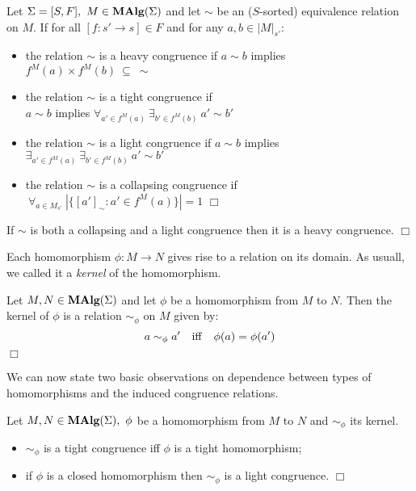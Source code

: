 \begin{Definition}
Let $\Sigma = [S,F],\ M \in \mbox{\rm\bf MAlg}(\Sigma)$ and let $\sim$ be an
($S$-sorted) equivalence relation on $M$.  If for all $[f : s'
\rightarrow s] \in F$ and for any $a,b \in |M|_{s'}$:
\begin{itemize}
\item{the relation $\sim$ is a heavy congruence if
      $a \sim b$ implies $f^M(a) \times f^M(b) \ \subseteq \ \sim$ }
\item{the relation $\sim$ is a tight congruence if \\
      $a \sim b$ implies
      $\forall_{a' \in f^M(a)}\ \exists_{b' \in f^M(b)}\ a' \sim b'$}
\item{the relation $\sim$ is a light congruence if 
      $a \sim b$ implies
      $\exists_{a' \in f^M(a)}\ \exists_{b' \in f^M(b)}\ a' \sim b'$}
\item{the relation $\sim$ is a collapsing congruence if 
      $\ \forall_{a \in M_{s'}}\ |\{ [a']_\sim : a' \in f^M(a) \}| = 1$ 
      \hfill$\Box$}
\end{itemize}
\end{Definition}

\begin{Fact}
If $\sim$ is both a collapsing and a light congruence then it is a
heavy congruence.
\hfill$\Box$
\end{Fact} 

Each homomorphism $\phi: M \rightarrow N$ gives rise to a relation on
its domain. As usuall, we called it a {\em kernel\/} of the
homomorphism.

\begin{Definition}
Let $M,N \in \mbox{\rm\bf MAlg}(\Sigma)$ and let $\phi$ be a homomorphism from $M$
to $N$. Then the kernel of $\phi$ is a relation $\sim_\phi$ on $M$
given by:
\[ a \sim_\phi a' \quad {\rm iff}\quad \phi(a)=\phi(a') \]
\hfill$\Box$
\end{Definition} 

We can now state two basic observations on dependence between types of
homomorphisms and the induced congruence relations.
    
\begin{Fact}
Let $M,N \in \mbox{\rm\bf MAlg}(\Sigma),\ \phi$ be a homomorphism from $M$ to $N$
and $\sim_\phi$ its kernel.
\begin{itemize}
  \item{$\sim_\phi$ is a tight congruence iff $\phi$ is a tight homomorphism;}
  \item{if $\phi$ is a closed homomorphism then $\sim_\phi$ is a light 
        congruence. \hfill$\Box$}
\end{itemize}
\end{Fact}

